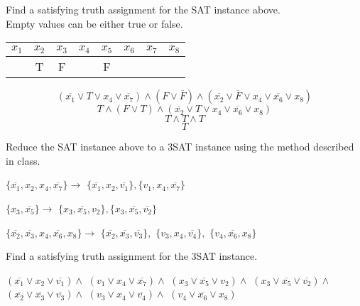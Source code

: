 \documentclass[12pt]{article}
\begin{document}
\begin{flushleft}
   Find a satisfying truth assignment for the SAT instance above.\\
   Empty values can be either true or false.

   \begin{center}
      \begin{tabular}{|c|c|c|c|c|c|c|c|}\hline
         $x_1$ & $x_2$ & $x_3$ & $x_4$ & $x_5$ & $x_6$ & $x_7$ & $x_8$ \\\hline
         & T & F & & F & & & \\\hline      
      \end{tabular}

      \[\left(\overline{x_1} \vee T \vee x_4 \vee \overline{x_7}\right) \wedge \left(F \vee \overline{F}\right) \wedge \left(\overline{x_2} \vee \overline{F} \vee x_4 \vee \overline{x_6} \vee x_8 \right) \]
      \[T \wedge \left(F \vee T\right) \wedge \left(\overline{x_2} \vee T \vee x_4 \vee \overline{x_6} \vee x_8 \right) \]
      \[T \wedge T \wedge T \]
      \[T\]

   \end{center}

   Reduce the SAT instance above to a 3SAT instance using the method described in class.

   $\lbrace \overline{x_1}, x_2, x_4, \overline{x_7}\rbrace \to$
   $ \lbrace \overline{x_1},x_2,\overline{v_1} \rbrace, \lbrace v_1, x_4, \overline{x_7} \rbrace$

   $\lbrace x_3 ,\overline{x_5}\rbrace \to$
   $\lbrace x_3, \overline{x_5}, v_2 \rbrace, \lbrace x_3, \overline{x_5}, \overline{v_2} \rbrace$

   $\lbrace \overline{x_2} , \overline{x_3} , x_4 , \overline{x_6} , x_8 \rbrace \to$
   $\lbrace \overline{x_2}, \overline{x_3}, \overline{v_3} \rbrace , $
   $\lbrace v_3, x_4, \overline{v_4} \rbrace , $
   $\lbrace v_4, \overline{x_6}, x_8 \rbrace$

   Find a satisfying truth assignment for the 3SAT instance.

   \begin{center}
      $\left(\overline{x_1} \lor x_2 \lor \overline{v_1}\right) \land$
      $\left(v_1 \lor x_4 \lor \overline{x_7}\right) \land$
      $\left(x_3 \lor \overline{x_5} \lor v_2\right) \land$
      $\left(x_3 \lor \overline{x_5} \lor \overline{v_2}\right) \land$
      $\left(\overline{x_2} \lor \overline{x_3} \lor \overline{v_3}\right) \land$
      $\left(v_3 \lor x_4 \lor \overline{v_4}\right) \land$
      $\left(v_4 \lor \overline{x_6} \lor x_8\right)$


\end{center}
\end{flushleft}
\end{document}
